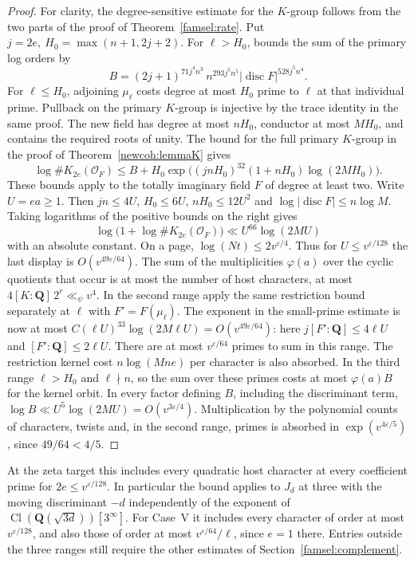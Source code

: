 \begin{proof}
For clarity, the degree-sensitive estimate for the \(K\)-group
follows from the two parts of the proof of Theorem~\ref{famsel:rate}.
Put \(j=2e,\ H_0=\max(n+1,2j+2)\). For \(\ell>H_0\),
\cite[Theorem 1.1]{bayerEmeryHouriet} bounds the sum of the
primary log orders by
\[
 B=(2j+1)^{71j^4 n^3}\,n^{293j^5 n^5}
          |\operatorname{disc}F|^{528j^5 n^4}.
\]
For \(\ell\le H_0\), adjoining \(\mu_\ell\) costs degree at
most \(H_0\) prime to \(\ell\) at that individual prime. Pullback
on the primary \(K\)-group is injective by the trace identity in
the same proof. The new field has degree at most \(nH_0\),
conductor at most \(MH_0\), and contains the required roots of
unity. The bound for the full primary \(K\)-group in the proof
of Theorem~\ref{newcoh:lemmaK} gives
\[
 \log\#K_{2e}(\mathcal O_F)
 \le B+H_0\exp\bigl((jnH_0)^{32}(1+nH_0)\log(2MH_0)\bigr).
\]
These bounds apply to the totally imaginary field \(F\) of
degree at least two. Write \(U=ea\ge1\). Then \(jn\le4U\),
\(H_0\le6U\), \(nH_0\le12U^2\) and
\(\log|\operatorname{disc}F|\le n\log M\).
Taking logarithms of the positive bounds on the right gives
\[
 \log\bigl(1+\log\#K_{2e}(\mathcal O_F)\bigr)
       \ll U^{66}\log(2MU)
\]
with an absolute constant. On a page, \(\log(Nt)\le2v^{\varepsilon/4}\).
Thus for \(U\le v^{\varepsilon/128}\) the last display is
\(O(v^{49\varepsilon/64})\). The sum of the multiplicities
\(\varphi(a)\) over the cyclic quotients that occur is at most
the number of host characters, at most
\(4[K:\mathbf Q]\,2^r\ll_\psi v^4\).
In the second range apply the same restriction bound separately
at \(\ell\) with \(F'=F(\mu_\ell)\). The exponent in the
small-prime estimate is now at most
\(C(\ell U)^{33}\log(2M\ell U)=O(v^{49\varepsilon/64})\):
here \(j[F':\mathbf Q]\le4\ell U\) and
\([F':\mathbf Q]\le2\ell U\). There are at most
\(v^{\varepsilon/64}\) primes to sum in this range. The restriction
kernel cost \(n\log(Mne)\) per character is also absorbed.
In the third range \(\ell>H_0\) and \(\ell\nmid n\), so the sum over
these primes costs at most \(\varphi(a)B\) for the kernel orbit.
In every factor defining \(B\), including the discriminant term,
\(\log B\ll U^5\log(2MU)=O(v^{3\varepsilon/4})\).
Multiplication by the polynomial counts of characters, twists and,
in the second range, primes is absorbed in \(\exp(v^{4\varepsilon/5})\),
since \(49/64<4/5\).
\end{proof}

At the zeta target this includes every quadratic host character
at every coefficient prime for \(2e\le v^{\varepsilon/128}\).
In particular the bound applies to \(J_d\) at three with the
moving discriminant \(-d\) independently of the exponent of
\(\operatorname{Cl}(\mathbf Q(\sqrt{3d}))[3^\infty]\). For
Case~V it includes every character of order at most
\(v^{\varepsilon/128}\), and also those of order at most
\(v^{\varepsilon/64}/\ell\), since \(e=1\) there. Entries outside
the three ranges still require the other estimates of
Section~\ref{famsel:complement}.

